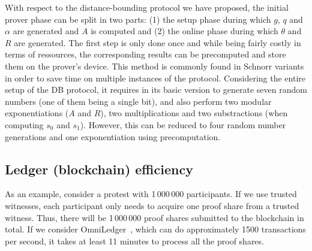 With respect to the distance-bounding protocol we have proposed, the initial prover phase can be split in two parts: (1) the setup phase during which $g$, $q$ and $\alpha$ are generated and $A$ is computed and (2) the online phase during which $\theta$ and $R$ are generated. 
The first step is only done once and while being fairly costly in terms of ressources, the corresponding results can be precomputed and store them on the prover's device. 
This method is commonly found in Schnorr variants in order to save time on multiple instances of the protocol.
Considering the entire setup of the DB protocol, it requires in its basic version to generate seven random numbers (one of them being a single bit), and also perform two modular exponentiations ($A$ and $R$), two multiplications and two substractions (when computing $s_0$ and $s_1$). 
However, this can be reduced to four random number generations and one exponentiation using precomputation.


\subsection{Ledger (blockchain) efficiency}
As an example, consider a protest with 1\,000\,000 participants.
If we use trusted witnesses, each participant only needs to acquire one proof share from a trusted witness.
Thus, there will be 1\,000\,000 proof shares submitted to the blockchain in total.
If we consider OmniLedger~\cite{OmniLedger}, which can do approximately 1500 transactions per second, it takes at least 11 minutes to process all the proof shares.

